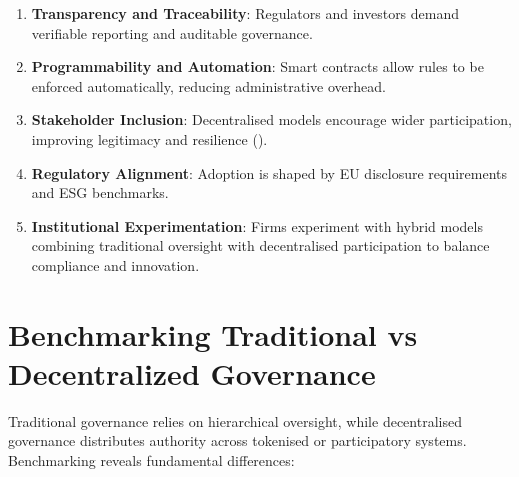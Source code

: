 \documentclass[
  english,
  12pt,
  oneside,
  open=any]{scrbook}
\providecommand{\tightlist}{%
  \setlength{\itemsep}{0pt}\setlength{\parskip}{0pt}}\usepackage{longtable,booktabs,array}
\begin{document}
\begin{enumerate}
\def\labelenumi{\arabic{enumi}.}
\tightlist
\item
  \textbf{Transparency and Traceability}: Regulators and investors
  demand verifiable reporting and auditable governance.\\
\item
  \textbf{Programmability and Automation}: Smart contracts allow rules
  to be enforced automatically, reducing administrative overhead.\\
\item
  \textbf{Stakeholder Inclusion}: Decentralised models encourage wider
  participation, improving legitimacy and resilience
  ().\\
\item
  \textbf{Regulatory Alignment}: Adoption is shaped by EU disclosure
  requirements and ESG benchmarks.\\
\item
  \textbf{Institutional Experimentation}: Firms experiment with hybrid
  models combining traditional oversight with decentralised
  participation to balance compliance and innovation.
\end{enumerate}

\section{Benchmarking Traditional vs Decentralized
Governance}\label{sec-benchmark}

Traditional governance relies on hierarchical oversight, while
decentralised governance distributes authority across tokenised or
participatory systems. Benchmarking reveals fundamental differences:
\end{document}
